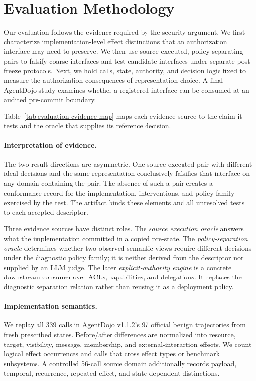 \section{Evaluation Methodology}

Our evaluation follows the evidence required by the security argument. We first
characterize implementation-level effect distinctions that an authorization
interface may need to preserve. We then use source-executed,
policy-separating pairs to falsify coarse interfaces and test candidate
interfaces under separate post-freeze protocols. Next, we hold calls, state,
authority, and decision logic fixed to measure the authorization consequences
of representation choice. A final AgentDojo study examines whether a registered
interface can be consumed at an audited pre-commit boundary.


Table~\ref{tab:evaluation-evidence-map} maps each evidence source to the claim
it tests and the oracle that supplies its reference decision.

\paragraph{Interpretation of evidence.}
The two result directions are asymmetric. One source-executed pair with
different ideal decisions and the same representation conclusively falsifies
that interface on any domain containing the pair. The absence of such a pair
creates a conformance record for the implementation, interventions, and policy
family exercised by the test. The artifact binds these elements and all
unresolved tests to each accepted descriptor.

Three evidence sources have distinct roles. The \emph{source execution oracle}
answers what the implementation committed in a copied pre-state. The
\emph{policy-separation oracle} determines whether two observed semantic views
require different decisions under the diagnostic policy family; it is neither
derived from the descriptor nor supplied by an LLM judge. The later
\emph{explicit-authority engine} is a concrete downstream consumer over ACLs,
capabilities, and delegations. It replaces the diagnostic separation relation
rather than reusing it as a deployment policy.

\paragraph{Implementation semantics.}
We replay all 339 calls in AgentDojo v1.1.2's 97 official benign trajectories
from fresh prescribed states. Before/after differences are normalized into
resource, target, visibility, message, membership, and external-interaction
effects. We count logical effect occurrences and calls that cross effect types
or benchmark subsystems. A controlled 56-call source domain additionally
records payload, temporal, recurrence, repeated-effect, and state-dependent
distinctions.

